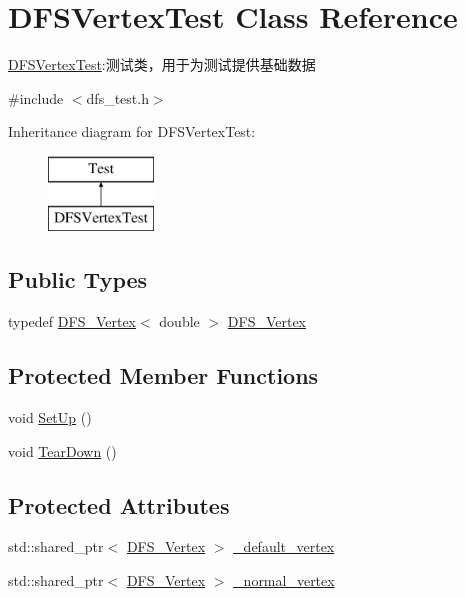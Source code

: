 \hypertarget{class_d_f_s_vertex_test}{}\section{D\+F\+S\+Vertex\+Test Class Reference}
\label{class_d_f_s_vertex_test}


\hyperlink{class_d_f_s_vertex_test}{D\+F\+S\+Vertex\+Test}\+:测试类，用于为测试提供基础数据  




{\ttfamily \#include $<$dfs\+\_\+test.\+h$>$}

Inheritance diagram for D\+F\+S\+Vertex\+Test\+:\begin{figure}[H]
\begin{center}
\leavevmode
\includegraphics[height=2.000000cm]{class_d_f_s_vertex_test}
\end{center}
\end{figure}
\subsection*{Public Types}
\begin{DoxyCompactItemize}
\item 
typedef \hyperlink{class_d_f_s_vertex_test_aee693bcc01455e6f663b1404ce66e914}{D\+F\+S\+\_\+\+Vertex}$<$ double $>$ \hyperlink{class_d_f_s_vertex_test_aee693bcc01455e6f663b1404ce66e914}{D\+F\+S\+\_\+\+Vertex}
\end{DoxyCompactItemize}
\subsection*{Protected Member Functions}
\begin{DoxyCompactItemize}
\item 
void \hyperlink{class_d_f_s_vertex_test_a2a285e5c1ce500544b5591107e251357}{Set\+Up} ()
\item 
void \hyperlink{class_d_f_s_vertex_test_a3592b0e27fb73147848d2251eb063730}{Tear\+Down} ()
\end{DoxyCompactItemize}
\subsection*{Protected Attributes}
\begin{DoxyCompactItemize}
\item 
std\+::shared\+\_\+ptr$<$ \hyperlink{class_d_f_s_vertex_test_aee693bcc01455e6f663b1404ce66e914}{D\+F\+S\+\_\+\+Vertex} $>$ \hyperlink{class_d_f_s_vertex_test_aeb4886b7d27389066e8ade9c7d5a1b87}{\+\_\+default\+\_\+vertex}
\item 
std\+::shared\+\_\+ptr$<$ \hyperlink{class_d_f_s_vertex_test_aee693bcc01455e6f663b1404ce66e914}{D\+F\+S\+\_\+\+Vertex} $>$ \hyperlink{class_d_f_s_vertex_test_a7c88bbdb6487f913f67ed34f915381e4}{\+\_\+normal\+\_\+vertex}
\end{DoxyCompactItemize}


